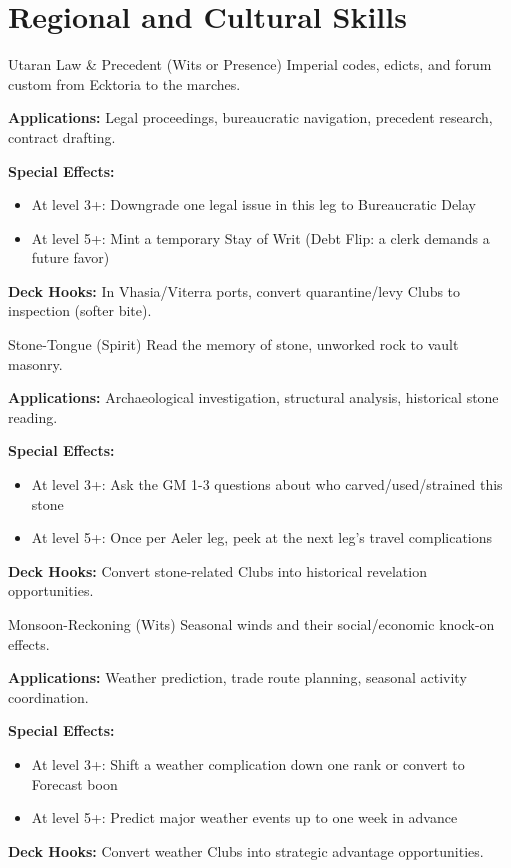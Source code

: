 \section{Regional and Cultural Skills}

\begin{skillbox}{Utaran Law \& Precedent (Wits or Presence)}
Imperial codes, edicts, and forum custom from Ecktoria to the marches.

\textbf{Applications:} Legal proceedings, bureaucratic navigation, precedent research, contract drafting.

\textbf{Special Effects:}
\begin{itemize}
    \item At level 3+: Downgrade one legal issue in this leg to Bureaucratic Delay
    \item At level 5+: Mint a temporary Stay of Writ (Debt Flip: a clerk demands a future favor)
\end{itemize}

\textbf{Deck Hooks:} In Vhasia/Viterra ports, convert quarantine/levy Clubs to inspection (softer bite).
\end{skillbox}

\begin{skillbox}{Stone-Tongue (Spirit)}
Read the memory of stone, unworked rock to vault masonry.

\textbf{Applications:} Archaeological investigation, structural analysis, historical stone reading.

\textbf{Special Effects:}
\begin{itemize}
    \item At level 3+: Ask the GM 1-3 questions about who carved/used/strained this stone
    \item At level 5+: Once per Aeler leg, peek at the next leg's travel complications
\end{itemize}

\textbf{Deck Hooks:} Convert stone-related Clubs into historical revelation opportunities.
\end{skillbox}

\begin{skillbox}{Monsoon-Reckoning (Wits)}
Seasonal winds and their social/economic knock-on effects.

\textbf{Applications:} Weather prediction, trade route planning, seasonal activity coordination.

\textbf{Special Effects:}
\begin{itemize}
    \item At level 3+: Shift a weather complication down one rank or convert to Forecast boon
    \item At level 5+: Predict major weather events up to one week in advance
\end{itemize}

\textbf{Deck Hooks:} Convert weather Clubs into strategic advantage opportunities.
\end{skillbox}

